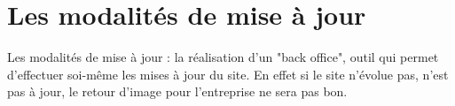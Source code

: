 \section{Les modalités de mise à jour}
Les modalités de mise à jour : la réalisation d'un "back office", outil qui permet d'effectuer soi-même les mises à jour du site.
En effet si le site n'évolue pas, n'est pas à jour, le retour d'image pour l'entreprise ne sera pas bon.